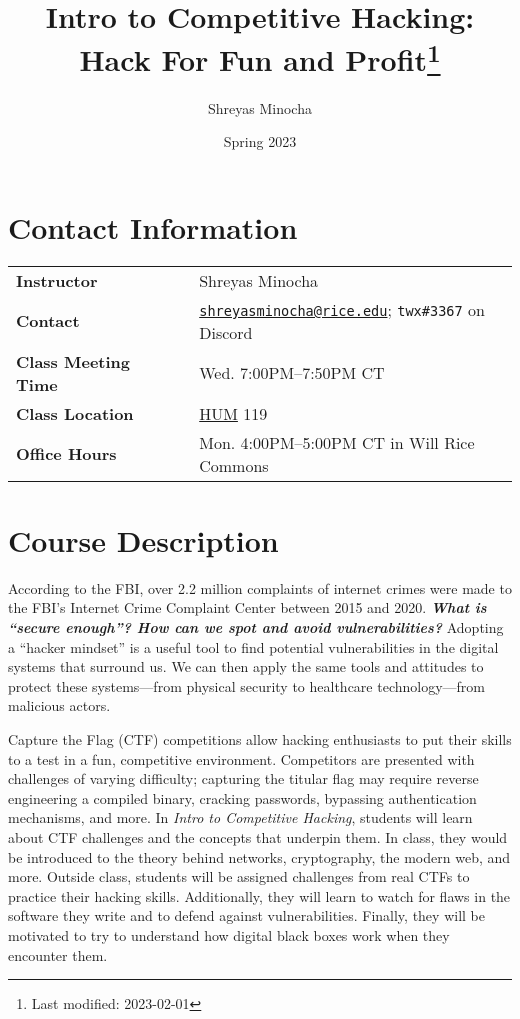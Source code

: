 \documentclass[11pt]{article}
\title{Intro to Competitive Hacking: Hack For Fun and Profit\footnote{Last modified: 2023-02-01}}
\author{Shreyas Minocha}
\date{Spring 2023}
\begin{document}
\maketitle

\begin{flushleft}
\section{Contact Information}\label{contact-information}

\setlength{\tabcolsep}{0pt}
\begin{tabular}{ll}
\textbf{Instructor} & Shreyas Minocha \\
\textbf{Contact} & \href{mailto:shreyasminocha@rice.edu}{\texttt{shreyasminocha@rice.edu}}; \texttt{twx\#3367} on Discord\\
\textbf{Class Meeting Time}~~~~~ & Wed. 7:00PM--7:50PM CT \\
\textbf{Class Location} & \href{https://www.openstreetmap.org/node/8379958483}{HUM} 119 \\
\textbf{Office Hours} & Mon. 4:00PM--5:00PM CT in Will Rice Commons
\end{tabular}
\setlength{\tabcolsep}{6pt}

\section{Course Description}\label{course-description}

According to the FBI, over 2.2 million complaints of internet crimes were made to the FBI's Internet Crime Complaint Center between 2015 and 2020. \textit{\textbf{What is ``secure enough''? How can we spot and avoid vulnerabilities?}} Adopting a ``hacker mindset'' is a useful tool to find potential vulnerabilities in the digital systems that surround us. We can then apply the same tools and attitudes to protect these systems—from physical security to healthcare technology—from malicious actors.

Capture the Flag (CTF) competitions allow hacking enthusiasts to put their skills to a test in a fun, competitive environment. Competitors are presented with challenges of varying difficulty; capturing the titular flag may require reverse engineering a compiled binary, cracking passwords, bypassing authentication mechanisms, and more. In \textit{Intro to Competitive Hacking}, students will learn about CTF challenges and the concepts that underpin them. In class, they would be introduced to the theory behind networks, cryptography, the modern web, and more. Outside class, students will be assigned challenges from real CTFs to practice their hacking skills. Additionally, they will learn to watch for flaws in the software they write and to defend against vulnerabilities. Finally, they will be motivated to try to understand how digital black boxes work when they encounter them.


\end{flushleft}
\end{document}
